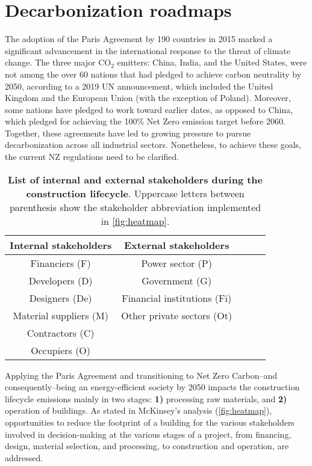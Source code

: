 \section{Decarbonization roadmaps}
\label{sec:decarbonization_roadmaps}

The adoption of the Paris Agreement by 190 countries in 2015 marked a significant advancement in the international response to the threat of climate change. The three major CO$_2$ emitters: China, India, and the United States, were not among the over 60 nations that had pledged to achieve carbon neutrality by 2050, according to a 2019 UN announcement, which included the United Kingdom and the European Union (with the exception of Poland).\autocite{summit2019report} Moreover, some nations have pledged to work toward earlier dates, as opposed to China, which pledged for achieving the 100\% Net Zero emission target before 2060.\autocite{moghaddasi2021net} Together, these agreements have led to growing pressure to pursue decarbonization across all industrial sectors.\autocite{hoffmann2021decarbonization} Nonetheless, to achieve these goals, the current NZ regulations need to be clarified.\autocite{moghaddasi2021net}

\begin{table}[!htb]
  \caption[List of internal and external stakeholders during the construction lifecycle]{\textbf{List of internal and external stakeholders during the construction lifecycle}. Uppercase letters between parenthesis show the stakeholder abbreviation implemented in \autoref{fig:heatmap}.}
  \begin{scriptsize}
    \begin{tabulary}{0.65\linewidth}{ccccc}
      \textbf{Internal stakeholders} & \textbf{External stakeholders}  \\ \hline
      Financiers (F) &  Power sector (P) \\
      Developers (D) &  Government (G)   \\
      Designers (De) &  Financial institutions (Fi) \\
      Material suppliers (M) &  Other private sectors (Ot) \\
      Contractors (C) & \\
      Occupiers (O) & \\
    \end{tabulary}
  \end{scriptsize}
  \label{tab:stakeholders}
\end{table}

Applying the Paris Agreement and transitioning to Net Zero Carbon–and consequently–being an energy-efficient society by 2050 impacts the construction lifecycle emissions mainly in two stages: \textbf{1)} processing raw materials, and \textbf{2)} operation of buildings. As stated in McKinsey's analysis\autocite{mckinsey_2020} (\autoref{fig:heatmap}), opportunities to reduce the footprint of a building for the various stakeholders involved in decision-making at the various stages of a project, from financing, design, material selection, and processing, to construction and operation, are addressed. 

